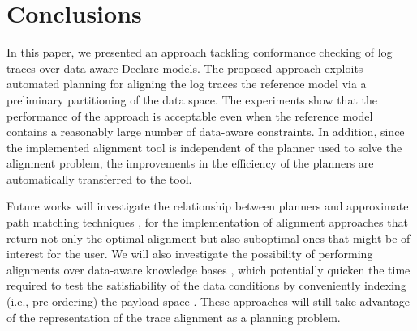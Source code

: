 \section{Conclusions}
In this paper, we presented an approach tackling conformance checking of log traces over data-aware Declare models. The proposed approach exploits automated planning for aligning the log traces the reference model via a preliminary partitioning of the data space. The experiments show that the performance of the approach is acceptable even when the reference model contains a reasonably large number of data-aware constraints. In addition, since the implemented alignment tool is independent of the planner used to solve the alignment problem, the improvements in the efficiency of the planners are automatically transferred to the tool.

Future works will investigate the relationship between planners and approximate path matching techniques \cite{Myers1989}, for the implementation of alignment approaches that return not only the optimal alignment but also suboptimal ones that might be of interest for the user. We will also investigate the possibility of performing alignments over data-aware knowledge bases \cite{10.1007/978-3-319-39696-5_18}, which potentially quicken the time required to test the satisfiability of the data conditions by conveniently indexing (i.e., pre-ordering) the payload space \cite{IdreosGNMMK12}. These approaches will still take advantage of the representation of the trace alignment as a planning problem. 